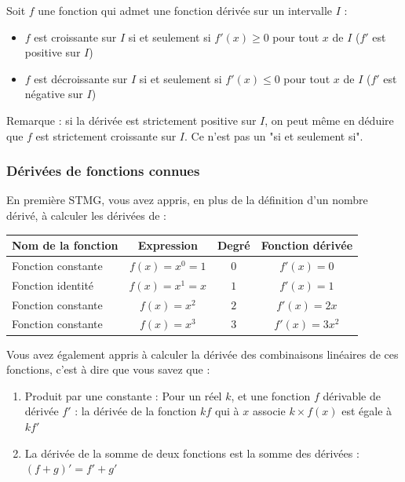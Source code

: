 \documentclass[10pt,a4paper]{book}
\begin{document}
\begin{th}
    Soit $f$ une fonction qui admet une fonction dérivée sur un intervalle $I$ :
    \begin{itemize}
        \item $f$ est croissante sur $I$ si et seulement si $f'(x) \geq 0$ pour tout $x$ de $I$ ($f'$ est positive sur $I$)
        \item $f$ est décroissante sur $I$ si et seulement si $f'(x) \leq 0$ pour tout $x$ de $I$ ($f'$ est négative sur $I$)
    \end{itemize}
\end{th}

Remarque : si la dérivée est strictement positive sur $I$, on peut même en déduire que $f$ est strictement croissante sur $I$. Ce n'est pas un "si et seulement si".

\subsubsection{Dérivées de fonctions connues}

En première STMG, vous avez appris, en plus de la définition d'un nombre dérivé, à calculer les dérivées de : 

\begin{tabular}{|l|c|c|c|}
    \hline
    Nom de la fonction & Expression& Degré & Fonction dérivée \\
    \hline
    Fonction constante& $f(x) = x^0 = 1$ & $0$ & $f'(x)=0$ \\
    \hline
    Fonction identité& $f(x) = x^1 = x$ & $1$ & $f'(x)=1$ \\
    \hline
    Fonction constante& $f(x) = x^2$ & $2$ & $f'(x)=2x$ \\
    \hline
    Fonction constante& $f(x) = x^3$ & $3$ & $f'(x)=3x^2$ \\
    \hline
\end{tabular}

Vous avez également appris à calculer la dérivée des combinaisons linéaires de ces fonctions, c'est à dire que vous savez que :\begin{enumerate}
    \item Produit par une constante : Pour un réel $k$, et une fonction $f$ dérivable de dérivée $f'$ : la dérivée de la fonction $kf$ qui à $x$ associe $k\times f(x)$ est égale à $kf'$
    \item La dérivée de la somme de deux fonctions est la somme des dérivées : $(f+g)' = f'+g'$
\end{enumerate}
\end{document}
